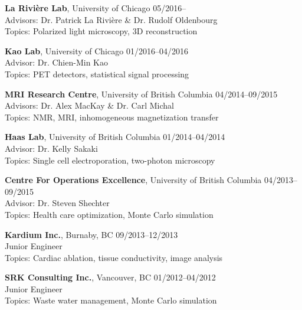 \documentclass[12pt,letterpaper]{article}
\begin{document}
\begin{benumerate}{5}
\item
  {\textbf{La Rivi\`ere Lab}, University of Chicago} \hfill 05/2016--\\
  Advisors: Dr. Patrick La Rivi\`ere \& Dr. Rudolf Oldenbourg\\
  Topics: Polarized light microscopy, 3D reconstruction
\item
  {\textbf{Kao Lab}, University of Chicago} \hfill 01/2016--04/2016\\
  Advisor: Dr. Chien-Min Kao\\
  Topics: PET detectors, statistical signal processing
\item
  {\textbf{MRI Research Centre}, University of British Columbia} \hfill 04/2014--09/2015\\
  Advisors: Dr. Alex MacKay \& Dr. Carl Michal\\
  Topics: NMR, MRI, inhomogeneous magnetization transfer
\item                
  {\textbf{Haas Lab}, University of British Columbia} \hfill 01/2014--04/2014\\
  Advisor: Dr. Kelly Sakaki\\
  Topics: Single cell electroporation, two-photon microscopy
\item
  {\textbf{Centre For Operations Excellence}, University of British Columbia} \hfill 04/2013--09/2015\\
  Advisor: Dr. Steven Shechter\\
  Topics: Health care optimization, Monte Carlo simulation
\end{benumerate}

\begin{benumerate}{2}
\item
  \textbf{Kardium Inc.}, Burnaby, BC \hfill 09/2013--12/2013\\
  Junior Engineer\\
  Topics: Cardiac ablation, tissue conductivity, image analysis
\item
  \textbf{SRK Consulting Inc.}, Vancouver, BC \hfill 01/2012--04/2012\\
  Junior Engineer\\
  Topics: Waste water management, Monte Carlo simulation
\end{benumerate}
\end{document}
